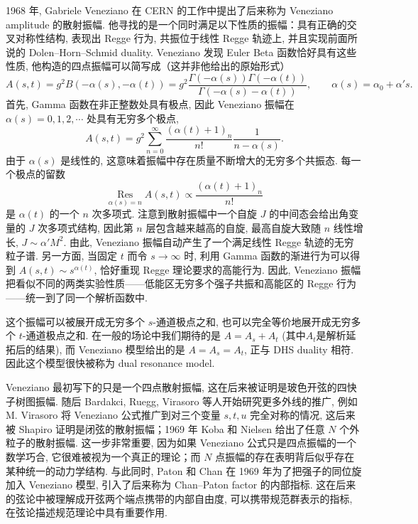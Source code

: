 \documentclass[10pt]{article}
\numberwithin{equation}{section}
\begin{document}
1968 年, Gabriele Veneziano 在 CERN 的工作中提出了后来称为 Veneziano amplitude 的散射振幅. 他寻找的是一个同时满足以下性质的振幅：具有正确的交叉对称性结构, 表现出 Regge 行为, 共振位于线性 Regge 轨迹上, 并且实现前面所说的 Dolen–Horn–Schmid duality. Veneziano 发现 Euler Beta 函数恰好具有这些性质, 他构造的四点振幅可以简写成（这并非他给出的原始形式）\cite{Veneziano1968,CappelliEtAl2012}
\begin{equation} 
A (s, t)=g^2B (-\alpha (s),-\alpha (t))=g^2\frac{\Gamma (-\alpha (s))\Gamma (-\alpha (t))}{\Gamma (-\alpha (s)-\alpha (t))},\qquad \alpha (s)=\alpha_0+\alpha's.
\end{equation}
首先, Gamma 函数在非正整数处具有极点, 因此 Veneziano 振幅在 $\alpha(s)=0,1,2,\cdots$ 处具有无穷多个极点,
\begin{equation}
A(s,t)
=
g^2
\sum_{n=0}^{\infty}
\frac{(\alpha(t)+1)_n}{n!}
\frac{1}{n-\alpha(s)}.
\end{equation}
由于 $\alpha(s)$ 是线性的, 这意味着振幅中存在质量不断增大的无穷多个共振态. 每一个极点的留数
\begin{equation}
\operatorname*{Res}_{\alpha(s)=n}A(s,t)
\propto
\frac{(\alpha(t)+1)_n}{n!}
\end{equation}
是 $\alpha(t)$ 的一个 $n$ 次多项式. 注意到散射振幅中一个自旋 $J$ 的中间态会给出角变量的 $J$ 次多项式结构, 因此第 $n$ 层包含越来越高的自旋, 最高自旋大致随 $n$ 线性增长, $J\sim \alpha'M^2$. 由此, Veneziano 振幅自动产生了一个满足线性 Regge 轨迹的无穷粒子谱. 另一方面, 当固定 $t$ 而令 $s\to\infty$ 时, 利用 Gamma 函数的渐进行为可以得到 $A(s,t)\sim s^{\alpha(t)}$, 恰好重现 Regge 理论要求的高能行为. 因此, Veneziano 振幅把看似不同的两类实验性质——低能区无穷多个强子共振和高能区的 Regge 行为——统一到了同一个解析函数中. 

这个振幅可以被展开成无穷多个 $s$-通道极点之和, 也可以完全等价地展开成无穷多个 $t$-通道极点之和. 在一般的场论中我们期待的是 $A=A_s+A_t$ (其中$A_t$是解析延拓后的结果), 而 Veneziano 模型给出的是 $A=A_s=A_t$, 正与 DHS duality 相符. 因此这个模型很快被称为 dual resonance model. 

Veneziano 最初写下的只是一个四点散射振幅, 这在后来被证明是玻色开弦的四快子树图振幅. 随后 Bardakci, Ruegg, Virasoro 等人开始研究更多外线的推广, 例如 M. Virasoro 将 Veneziano 公式推广到对三个变量 $s,t,u$ 完全对称的情况, 这后来被 Shapiro 证明是闭弦的散射振幅；1969 年 Koba 和 Nielsen 给出了任意 $N$ 个外粒子的散射振幅. 这一步非常重要, 因为如果 Veneziano 公式只是四点振幅的一个数学巧合, 它很难被视为一个真正的理论；而 $N$ 点振幅的存在表明背后似乎存在某种统一的动力学结构. 与此同时, Paton 和 Chan 在 1969 年为了把强子的同位旋加入 Veneziano 模型, 引入了后来称为 Chan–Paton factor 的内部指标. 这在后来的弦论中被理解成开弦两个端点携带的内部自由度, 可以携带规范群表示的指标, 在弦论描述规范理论中具有重要作用\cite{Virasoro1969,Shapiro1969,KobaNielsen1969,PatonChan1969}. 
\end{document}
